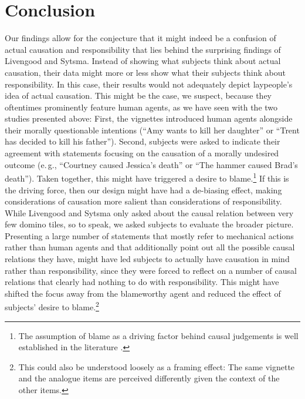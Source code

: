 \documentclass[12pt]{scrartcl}
\begin{document}
\section{Conclusion}
Our findings allow for the conjecture that it might indeed be a confusion of actual causation and responsibility that lies behind the surprising findings of Livengood and Sytsma. Instead of showing what subjects think about actual causation, their data might more or less show what their subjects think about responsibility. In this case, their results would not adequately depict laypeople's idea of actual causation. This might be the case, we suspect, because they oftentimes prominently feature human agents, as we have seen with the two studies presented above: First, the vignettes introduced human agents alongside their morally questionable intentions (\enquote{Amy wants to kill her daughter} or \enquote{Trent has decided to kill his father}). Second, subjects were asked to indicate their agreement with statements focusing on the causation of a morally undesired outcome (e.\,g., \enquote{Courtney caused Jessica's death} or \enquote{The hammer caused Brad's death}). Taken together, this might have triggered a desire to blame.\footnote{The assumption of blame as a driving factor behind causal judgements is well established in the literature \citep[see, e.\,g.,][]{alicke_culpable_2010,alicke_causation_2011,alicke_culpable_2012,danks_demoralizing_2014,rose_folk_2017,sytsma_causation_2020}.} If this is the driving force, then our design might have had a de-biasing effect, making considerations of causation more salient than considerations of responsibility. While Livengood and Sytsma only asked about the causal relation between very few domino tiles, so to speak, we asked subjects to evaluate the broader picture. Presenting a large number of statements that mostly refer to mechanical actions rather than human agents and that additionally point out all the possible causal relations they have, might have led subjects to actually have causation in mind rather than responsibility, since they were forced to reflect on a number of causal relations that clearly had nothing to do with responsibility. This might have shifted the focus away from the blameworthy agent and reduced the effect of subjects' desire to blame.\footnote{This could also be understood loosely as a framing effect: The same vignette and the analogue items are perceived differently given the context of the other items.}
\end{document}
